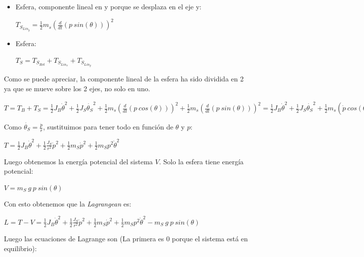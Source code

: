 \documentclass{article}
\begin{document}
\begin{itemize}
\begin{itemize}
\begin{center}
			$T_{S_{Lin_{x}}} = \frac{1}{2}m_{s}(\frac{d}{dt}(p\ cos(\theta)))^2$	
		\end{center}
		\item Esfera, componente lineal en y porque se desplaza en el eje y: 
		\begin{center}
			$T_{S_{Lin_{y}}} = \frac{1}{2}m_{s}(\frac{d}{dt}(p\ sin(\theta)))^2$
		\end{center}
		\item Esfera:
		\begin{center} 
			$T_{S} = T_{S_{Rot}} + T_{S_{Lin_{x}}} + T_{S_{Lin_{y}}}$
		\end{center}
	\end{itemize}
	Como se puede apreciar, la componente lineal de la esfera ha sido dividida en 2 ya que se mueve sobre los 2 ejes, no solo en uno.\\
	\begin{center}
		$T = T_{B} + T_{S} = \frac{1}{2}J_{B}\dot{\theta}^2 + \frac{1}{2}J_{S}\dot{\theta_{S}}^2 + \frac{1}{2}m_{s}(\frac{d}{dt}(p\ cos(\theta)))^2 + \frac{1}{2}m_{s}(\frac{d}{dt}(p\ sin(\theta)))^2 = 
		 \frac{1}{2}J_{B}\dot{\theta}^2 + \frac{1}{2}J_{S}\dot{\theta_{S}}^2 + \frac{1}{2}m_{s}(\dot{p}\ cos(\theta) - p\dot{\theta}sin(\theta))^2 + \frac{1}{2}m_{s}(\dot{p}\ sin(\theta) + p\dot{\theta}cos(\theta))^2 = 
		 \frac{1}{2}J_{B}\dot{\theta}^2 + \frac{1}{2}J_{S}\dot{\theta_{S}}^2 + \frac{1}{2}m_{S}\dot{p}^2 + \frac{1}{2}m_{S}p^2\dot{\theta}^2
		 $
	\end{center}
	Como $\dot{\theta_{S}} = \frac{\dot{p}}{r}$, sustituimos para tener todo en función de $\theta$ y $p$:
		\begin{center}
		$T = 
		\frac{1}{2}J_{B}\dot{\theta}^2 + \frac{1}{2}\frac{J_{S}}{r^2}\dot{p}^2 + \frac{1}{2}m_{S}\dot{p}^2 + \frac{1}{2}m_{S}p^2\dot{\theta}^2
		$
	\end{center}
	Luego obtenemos la energía potencial del sistema $V$. Solo la esfera tiene energía potencial:
	\begin{center}
		$V = m_{S}\ g\ p\ sin(\theta)$
	\end{center}
	Con esto obtenemos que la \textit{Lagrangean} es:
	\begin{center}
		$L = T - V
		 = \frac{1}{2}J_{B}\dot{\theta}^2 + \frac{1}{2}\frac{J_{S}}{r^2}\dot{p}^2 + \frac{1}{2}m_{S}\dot{p}^2 + \frac{1}{2}m_{S}p^2\dot{\theta}^2 - m_{S}\ g\ p\ sin(\theta)
		$
	\end{center}
	Luego las ecuaciones de Lagrange son (La primera es 0 porque el sistema está en equilibrio):
	\begin{center}

\end{center}
\end{itemize}
\end{document}

